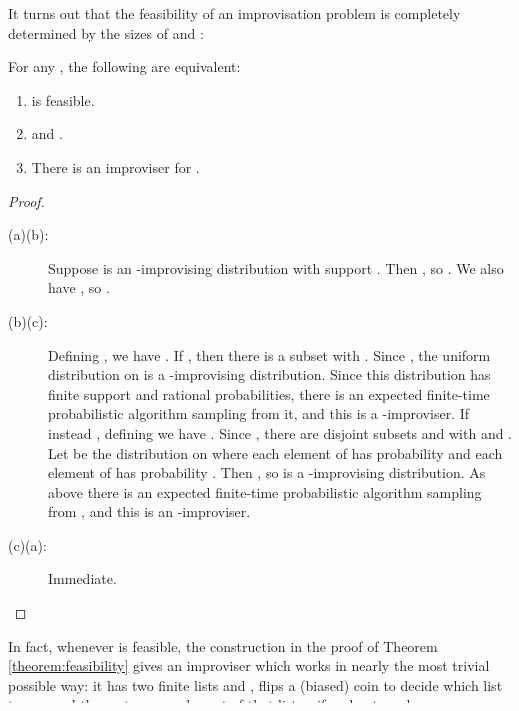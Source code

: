 \documentclass[a4paper,USenglish,numberwithinsect]{lipics}
\theoremstyle{plain}
\theoremstyle{definition}
\begin{document}
It turns out that the feasibility of an improvisation problem is completely determined by the sizes of  and :

\begin{theorem} \label{theorem:feasibility}
For any , the following are equivalent:
\begin{enumerate}[\quad (a)]
\item  is feasible.
\item  and .
\item There is an improviser for .
\end{enumerate}
\end{theorem}
\begin{proof}
\begin{description}
\item[(a)(b):] Suppose  is an -improvising distribution with support . Then , so . We also have , so .

\item[(b)(c):] Defining , we have . If , then there is a subset  with . Since , the uniform distribution on  is a -improvising distribution. Since this distribution has finite support and rational probabilities, there is an expected finite-time probabilistic algorithm sampling from it, and this is a -improviser. If instead , defining  we have . Since , there are disjoint subsets  and  with  and . Let  be the distribution on  where each element of  has probability  and each element of  has probability . Then , so  is a -improvising distribution. As above there is an expected finite-time probabilistic algorithm sampling from , and this is an -improviser.

\item[(c)(a):] Immediate. \qedhere
\end{description} 
\end{proof}

\begin{remark}
In fact, whenever  is feasible, the construction in the proof of Theorem \ref{theorem:feasibility} gives an improviser which works in nearly the most trivial possible way: it has two finite lists  and , flips a (biased) coin to decide which list to use, and then returns an element of that list uniformly at random.
\end{remark}

A consequence of this characterization is that when there are infinitely-many admissible improvisations, there is an improviser with zero error probability:

\begin{corollary}
If  is infinite,  is feasible for any .
\end{corollary}
\end{document}
